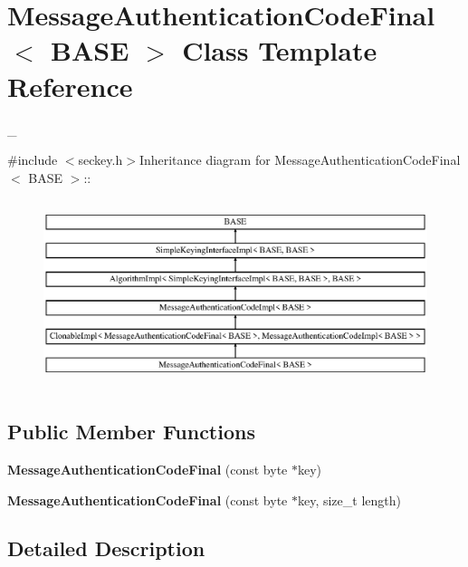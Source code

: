 \hypertarget{class_message_authentication_code_final}{
\section{MessageAuthenticationCodeFinal$<$ BASE $>$ Class Template Reference}
\label{class_message_authentication_code_final}
}


\_\-  


{\ttfamily \#include $<$seckey.h$>$}Inheritance diagram for MessageAuthenticationCodeFinal$<$ BASE $>$::\begin{figure}[H]
\begin{center}
\leavevmode
\includegraphics[height=5.49918cm]{class_message_authentication_code_final}
\end{center}
\end{figure}
\subsection*{Public Member Functions}
\begin{DoxyCompactItemize}
\item 
\hypertarget{class_message_authentication_code_final_a41d2c1ac0470912e22d99ba8f397781f}{
{\bfseries MessageAuthenticationCodeFinal} (const byte $\ast$key)}
\label{class_message_authentication_code_final_a41d2c1ac0470912e22d99ba8f397781f}

\item 
\hypertarget{class_message_authentication_code_final_a39ffff70fea0a92cbe8943a1f11cdb78}{
{\bfseries MessageAuthenticationCodeFinal} (const byte $\ast$key, size\_\-t length)}
\label{class_message_authentication_code_final_a39ffff70fea0a92cbe8943a1f11cdb78}

\end{DoxyCompactItemize}


\subsection{Detailed Description}
